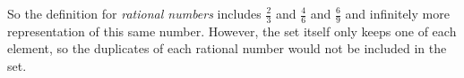\documentclass{amsart} %
\theoremstyle{definition} %
\theoremstyle{definition}
\theoremstyle{remark} %
\begin{document}

So the definition for \emph{rational numbers} includes $\frac{2}{3}$ and $\frac{4}{6}$ and $\frac{6}{9}$ and infinitely more representation of this same number. However, the set itself only keeps one of each element, so the duplicates of each rational number would not be included in the set.
\end{document}
